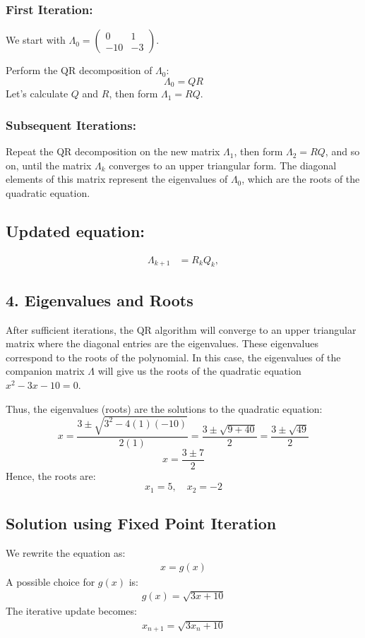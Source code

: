 \documentclass[journal]{IEEEtran}
\begin{document}
\subsubsection*{First Iteration:}
We start with \( \Lambda_0 = \begin{pmatrix} 0 & 1 \\ -10 & -3 \end{pmatrix} \).

Perform the QR decomposition of \( \Lambda_0 \):
\[
\Lambda_0 = QR
\]
Let’s calculate \( Q \) and \( R \), then form \( \Lambda_1 = RQ \).

\subsubsection*{Subsequent Iterations:}
Repeat the QR decomposition on the new matrix \( \Lambda_1 \), then form \( \Lambda_2 = RQ \), and so on, until the matrix \( \Lambda_k \) converges to an upper triangular form. The diagonal elements of this matrix represent the eigenvalues of \( \Lambda_0 \), which are the roots of the quadratic equation.
\subsection*{Updated equation:}
\begin{align}
    \Lambda_{k+1} &= R_k Q_k,
\end{align}
\subsection*{4. Eigenvalues and Roots}
After sufficient iterations, the QR algorithm will converge to an upper triangular matrix where the diagonal entries are the eigenvalues. These eigenvalues correspond to the roots of the polynomial. In this case, the eigenvalues of the companion matrix \( \Lambda \) will give us the roots of the quadratic equation \( x^2 - 3x - 10 = 0 \).

Thus, the eigenvalues (roots) are the solutions to the quadratic equation:
\[
x = \frac{3 \pm \sqrt{3^2 - 4(1)(-10)}}{2(1)} = \frac{3 \pm \sqrt{9 + 40}}{2} = \frac{3 \pm \sqrt{49}}{2}
\]
\[
x = \frac{3 \pm 7}{2}
\]
Hence, the roots are:
\[
x_1 = 5, \quad x_2 = -2
\]

\subsection*{ Solution using Fixed Point Iteration}
We rewrite the equation as:
\begin{align}
    x = g(x)
\end{align}
A possible choice for \( g(x) \) is:
\begin{align}
    g(x) = \sqrt{3x + 10}
\end{align}
The iterative update becomes:
\begin{align}
    x_{n+1} = \sqrt{3x_n + 10}
\end{align}
\end{document}
